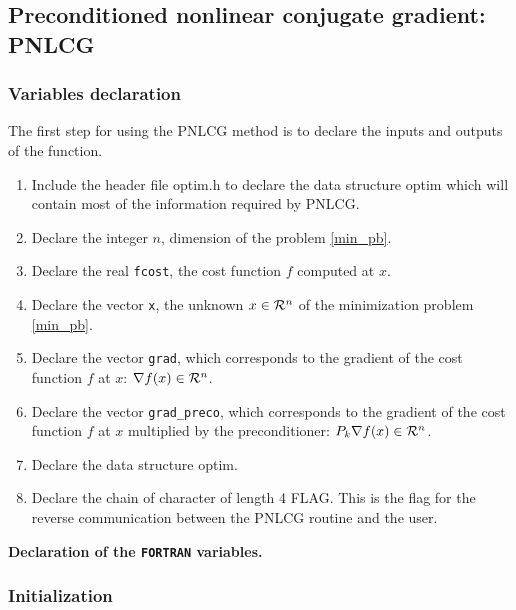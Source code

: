 \documentclass[a4paper,twoside,final,onecolumn,11pt,openright]{article}
\def \mathbb #1{{\cal #1}}
\begin{document}
\newpage
\subsection{Preconditioned nonlinear conjugate gradient: PNLCG}

\subsubsection{Variables declaration}
The first step for using the PNLCG method is to declare the inputs and outputs of the function. 
\begin{enumerate}
 \item Include the header file optim.h to declare the data structure optim which will contain most of the information required by PNLCG.
 \item Declare the integer $n$, dimension of the problem \eqref{min_pb}.
 \item Declare the real \texttt{fcost}, the cost function $f$ computed at $x$.
 \item Declare the vector \texttt{x}, the unknown $x \in \mathbb{R}^{n}$ of the minimization problem \eqref{min_pb}.
 \item Declare the vector \texttt{grad}, which corresponds to the gradient of the cost function $f$ at $x$: $\nabla f(x) \in \mathbb{R}^{n}$.
\item Declare the vector \texttt{grad\_preco}, which corresponds to the gradient of the cost function $f$ at $x$ multiplied by the preconditioner: $P_k\nabla f(x) \in \mathbb{R}^{n}$.
 \item Declare the data structure optim.
 \item Declare the chain of character of length 4 FLAG. This is the flag for the reverse communication between the PNLCG routine and the user.
\end{enumerate}

\framebox{
\small
 
} 
\normalsize
\begin{center}
\textbf{Declaration of the \texttt{FORTRAN} variables.} 
\end{center}

\subsubsection{Initialization}
\end{document}
